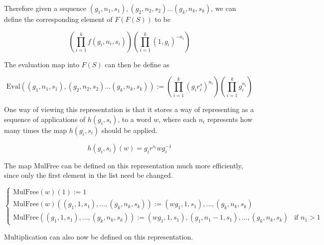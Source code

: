 \documentclass[11pt]{article} %
\theoremstyle{definition}
\theoremstyle{definition}
\theoremstyle{definition}
\theoremstyle{definition}
\theoremstyle{definition}
\theoremstyle{definition}
\begin{document}
Therefore given a sequence $(g_1, n_1, s_1), (g_2, n_2,s_2) \dots (g_k, n_k,s_k)$,
we can define the corresponding element of $F(F(S))$ to be

\begin{equation}
    \left(\prod_{i=1}^k f(g_i, n_i, s_i)\right)\left(\prod_{i=1}^k (1, g_i)^{-n_i}\right)
\end{equation}

The evaluation map into $F(S)$ can then be define as

\begin{equation}
  \text{Eval}((g_1, n_1, s_1), (g_2, n_2,s_2) \dots (g_k, n_k,s_k)) :=
  \left(\prod_{i=1}^k (g_ir^s_i)^{n_i}\right)\left(\prod_{i=1}^k g_i^{n_i}\right)
\end{equation}

One way of viewing this representation is that it stores a way of representing
as a sequence of applications of $h(g_i,s_i)$, to a word $w$, where each $n_i$
represents how many times the map $h(g_i, s_i)$ should be applied.

\begin{equation}
  h(g_i, s_i)(w) = g_ir^{s_i}wg_i^{-1}
\end{equation}

The map MulFree can be defined on this representation much more efficiently,
since only the first
element in the list need be changed.

\begin{equation}
  \begin{cases}
    \text{MulFree}(w)(1) := 1 \\
    \text{MulFree}(w)((g_1, 1, s_1), \dots ,(g_k, n_k, s_k)) := (wg_1, 1, s_1), \dots, (g_k, n_k, s_k)\\
    \text{MulFree}((g_1, 1, s_1),\dots ,(g_k, n_k, s_k)) :=
    (wg_1, 1, s_1),(g_1, n_1 - 1, s_1),\dots,(g_k, n_k, s_k) & \text{if }n_1 > 1
  \end{cases}
\end{equation}

Multiplication can also now be defined on this representation.
\end{document}
